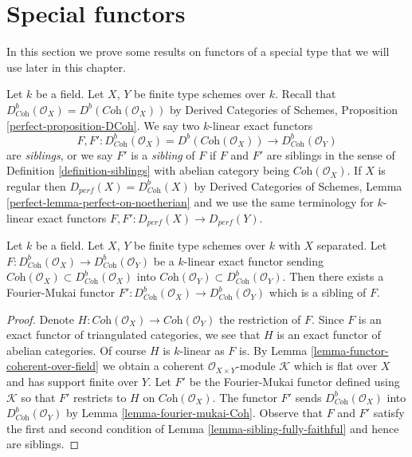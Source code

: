 \section{Special functors}
\label{section-special-functors}

\noindent
In this section we prove some results on functors of a special type
that we will use later in this chapter.

\begin{definition}
\label{definition-siblings-geometric}
Let $k$ be a field. Let $X$, $Y$ be finite type schemes over $k$.
Recall that
$D^b_{\textit{Coh}}(\mathcal{O}_X) = D^b(\textit{Coh}(\mathcal{O}_X))$
by Derived Categories of Schemes, Proposition \ref{perfect-proposition-DCoh}.
We say two $k$-linear exact functors
$$
F, F' :
D^b_{\textit{Coh}}(\mathcal{O}_X) = D^b(\textit{Coh}(\mathcal{O}_X))
\longrightarrow
D^b_{\textit{Coh}}(\mathcal{O}_Y)
$$
are {\it siblings}, or we say $F'$ is a {\it sibling} of $F$ if $F$ and $F'$
are siblings in the sense of Definition \ref{definition-siblings}
with abelian category being $\textit{Coh}(\mathcal{O}_X)$.
If $X$ is regular then $D_{perf}(X) = D^b_{\textit{Coh}}(X)$ by
Derived Categories of Schemes, Lemma \ref{perfect-lemma-perfect-on-noetherian}
and we use the same terminology for $k$-linear exact functors
$F, F' : D_{perf}(X) \to D_{perf}(Y)$.
\end{definition}

\begin{lemma}
\label{lemma-exact-functor-preserving-Coh}
Let $k$ be a field. Let $X$, $Y$ be finite type schemes over $k$ with
$X$ separated. Let
$F : D^b_{\textit{Coh}}(\mathcal{O}_X) \to D^b_{\textit{Coh}}(\mathcal{O}_Y)$
be a $k$-linear exact functor sending
$\textit{Coh}(\mathcal{O}_X) \subset D^b_{\textit{Coh}}(\mathcal{O}_X)$
into
$\textit{Coh}(\mathcal{O}_Y) \subset D^b_{\textit{Coh}}(\mathcal{O}_Y)$.
Then there exists a Fourier-Mukai functor
$F' : D^b_{\textit{Coh}}(\mathcal{O}_X) \to D^b_{\textit{Coh}}(\mathcal{O}_Y)$
which is a sibling of $F$.
\end{lemma}

\begin{proof}
Denote $H : \textit{Coh}(\mathcal{O}_X) \to \textit{Coh}(\mathcal{O}_Y)$
the restriction of $F$. Since $F$ is an exact functor of triangulated
categories, we see that $H$ is an exact functor of abelian categories.
Of course $H$ is $k$-linear as $F$ is. By
Lemma \ref{lemma-functor-coherent-over-field}
we obtain a coherent $\mathcal{O}_{X \times Y}$-module
$\mathcal{K}$ which is flat over $X$ and has support finite over $Y$.
Let $F'$ be the Fourier-Mukai functor defined using $\mathcal{K}$
so that $F'$ restricts to $H$ on $ \textit{Coh}(\mathcal{O}_X)$.
The functor $F'$ sends $D^b_{\textit{Coh}}(\mathcal{O}_X)$
into $D^b_{\textit{Coh}}(\mathcal{O}_Y)$ by
Lemma \ref{lemma-fourier-mukai-Coh}.
Observe that $F$ and $F'$ satisfy the first and second
condition of Lemma \ref{lemma-sibling-fully-faithful} and hence are siblings.
\end{proof}

